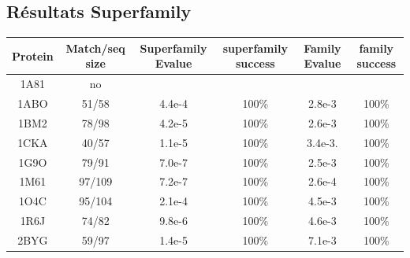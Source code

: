 \documentclass[a4paper,12pt]{book}
\begin{document}
    
    \clearpage





   \subsection{ Résultats Superfamily}


    \begin{table}[h]
           \raggedleft

      \begin{tabular}{|c|c|c|c|c|c|}

        \hline
        Protein & Match/seq size & Superfamily Evalue & superfamily success & Family Evalue & family success\\
        \hline
        1A81 & no & & & & \\
        1ABO & 51/58 & 4.4e-4 & 100\% & 2.8e-3 & 100\% \\
        1BM2 & 78/98 & 4.2e-5 & 100\% & 2.6e-3 & 100\% \\
        1CKA & 40/57 & 1.1e-5 & 100\% & 3.4e-3. & 100\% \\
        1G9O & 79/91 & 7.0e-7 & 100\% & 2.5e-3 & 100\%  \\
        1M61 & 97/109 & 7.2e-7 & 100\% & 2.6e-4 &  100\% \\
        1O4C & 95/104 & 2.1e-4 & 100\% & 4.5e-3 &  100\% \\
        1R6J & 74/82 & 9.8e-6 & 100\% & 4.6e-3 &  100\% \\
        2BYG & 59/97 & 1.4e-5 & 100\% & 7.1e-3 &  100\% \\

        \hline


 \end{tabular}      


 \label{tab_echec2BYG__1}       
\end{table}



    \clearpage
\end{document}
